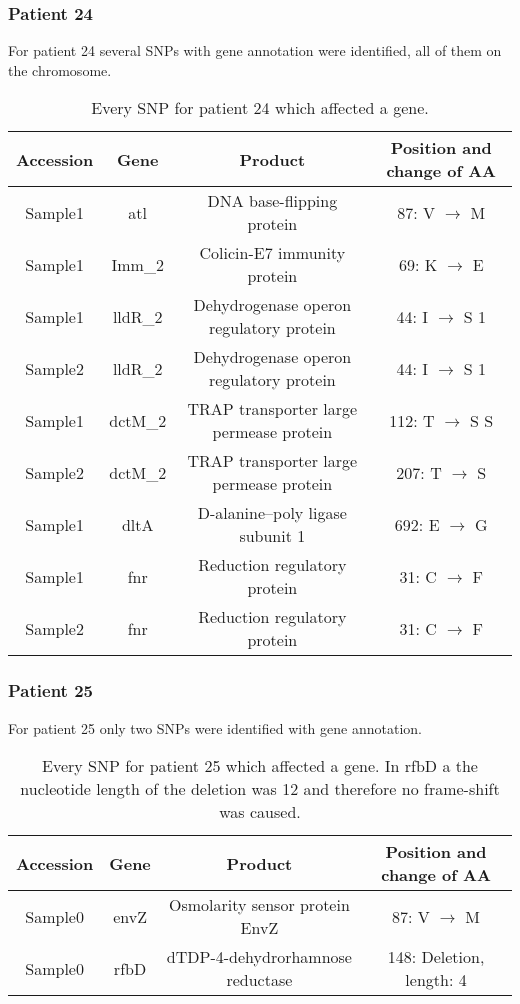 \subsubsection{Patient 24}
For patient 24 several SNPs with gene annotation were identified, all of them on the chromosome. 
\begin{table}[H]
	\begin{tabular}{|c c c c|}	
		\hline
		Accession & Gene & Product & Position and change of AA \\ [0.5ex]
		\hline\hline
		Sample1   & atl & DNA base-flipping protein   & 87: V $\rightarrow$ M               \\
		\hline
		Sample1   & Imm\_2 & Colicin-E7 immunity protein    & 69: K $\rightarrow$ E              \\
		\hline
		Sample1   & lldR\_2 & Dehydrogenase operon regulatory protein          & 44: I $\rightarrow$ S 1			\\
		\hline
		Sample2   & lldR\_2 & Dehydrogenase operon regulatory protein          & 44: I $\rightarrow$ S 1  			\\
		\hline
		Sample1   & dctM\_2 & TRAP transporter large permease protein     & 112: T $\rightarrow$ S S              \\
		\hline
		Sample2   & dctM\_2 & TRAP transporter large permease protein & 207: T $\rightarrow$ S              \\
		\hline
		Sample1   & dltA & D-alanine--poly ligase subunit 1              & 692: E $\rightarrow$ G               \\
		\hline
		Sample1   & fnr & Reduction regulatory protein            & 31: C $\rightarrow$ F             \\
		\hline
		Sample2   & fnr & Reduction regulatory protein       & 31: C $\rightarrow$ F              \\ 
		\hline
	\end{tabular}
	\caption{Every SNP for patient 24 which affected a gene.}
	\label{table:pat24_snp_annotated}
\end{table}	

\subsubsection{Patient 25}
For patient 25 only two SNPs were identified with gene annotation. 
\begin{table}[H]
	\begin{tabular}{|c c c c|}	
		\hline
		Accession & Gene & Product & Position and change of AA \\ [0.5ex]
		\hline\hline
		Sample0   & envZ & Osmolarity sensor protein EnvZ   & 87: V $\rightarrow$ M               \\
		\hline
		Sample0   & rfbD & dTDP-4-dehydrorhamnose reductase   & 148: Deletion, length: 4               \\
		\hline
	\end{tabular}
	\caption{Every SNP for patient 25 which affected a gene. In rfbD a the nucleotide length of the deletion was 12 and therefore no frame-shift was caused.}
	\label{table:pat25_snp_annotated}
\end{table}	

